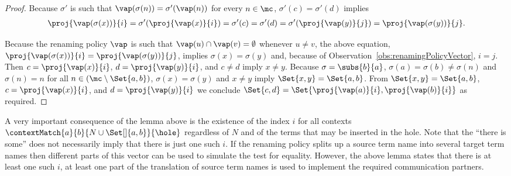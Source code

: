 \documentclass[]{article}
\begin{document}
\begin{proof}
	Because $ \sigma' $ is such that $ \vap\!\left( \sigma\!\left( n \right) \right) = \sigma'\!\left( \vap\!\left( n \right) \right) $ for every $ n \in \mc $, $ \sigma'\!\left( c \right) = \sigma'\!\left( d \right) $ implies
	\vspace{-1em}
	\begin{align*}
		\proj{\vap\!\left( \sigma\!\left( x \right) \right)}{i} = \sigma'\!\left( \proj{\vap\!\left( x \right)}{i} \right) = \sigma'\!\left( c \right) = \sigma'\!\left( d \right) = \sigma'\!\left( \proj{\vap\!\left( y \right)}{j} \right) = \proj{\vap\!\left( \sigma\!\left( y \right) \right)}{j}.
	\end{align*}
	
	\vspace{-1em}
	\noindent
	Because the renaming policy $ \vap $ is such that $ \vap\!\left( u \right) \cap \vap\!\left( v \right) = \emptyset $ whenever $ u \neq v $, the above equation, \ie $ \proj{\vap\!\left( \sigma\!\left( x \right) \right)}{i} = \proj{\vap\!\left( \sigma\!\left( y \right) \right)}{j} $, implies $ \sigma\!\left( x \right) = \sigma\!\left( y \right) $ and, because of Observation~\ref{obs:renamingPolicyVector}, $ i = j $.
	Then $ c = \proj{\vap\!\left( x \right)}{i} $, $ d = \proj{\vap\!\left( y \right)}{i} $, and $ c \neq d $ imply $ x \neq y $.
	Because $ \sigma = \subs{b}{a} $, \ie $ \sigma(a) = \sigma(b) \neq \sigma(n) $ and $ \sigma\!\left( n \right) = n $ for all $ n \in \left( \mc \setminus \Set{ a, b } \right) $, $ \sigma\!\left( x \right) = \sigma\!\left( y \right) $ and $ x \neq y $ imply $ \Set{ x, y } = \Set{ a, b } $.
	From $ \Set{ x, y } = \Set{ a, b } $, $ c = \proj{\vap\!\left( x \right)}{i} $, and $ d = \proj{\vap\!\left( y \right)}{i} $ we conclude $ \Set{ c, d } = \Set{ \proj{\vap\!\left( a \right)}{i}, \proj{\vap\!\left( b \right)}{i} } $ as required.
\end{proof}

\noindent
A very important consequence of the lemma above is the existence of the index $ i $ for all contexts $ \contextMatch{a}{b}{N \cup \Set[]{ a, b }}{\hole} $ regardless of $ N $ and of the terms that may be inserted in the hole. Note that the ``there is some'' does not necessarily imply that there is just one such $ i $. If the renaming policy splits up a source term name into several target term names then different parts of this vector can be used to simulate the test for equality. However, the above lemma states that there is at least one such $ i $, \ie at least one part of the translation of source term names is used to implement the required communication partners.
\end{document}
